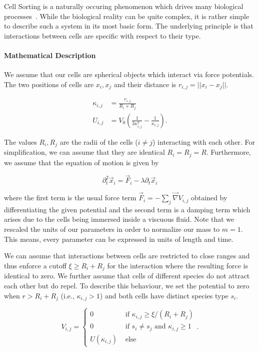 \documentclass[fontsize=11pt,a4paper]{article}
\begin{document}
Cell Sorting is a naturally occuring phenomenon which drives many biological
processes~\cite{Steinberg1963,Graner1992}.
While the biological reality can be quite complex, it is rather simple to describe such
a system in its most basic form.
The underlying principle is that interactions between cells are specific with respect to their type.

\paragraph{Mathematical Description}
We assume that our cells are spherical objects which interact via force potentials.
The two positions of cells are $x_i,x_j$ and their distance is $r_{i,j}=||x_i-x_j||$.

\begin{align}
    \kappa_{i,j} &= \frac{r_{i,j}}{R_i + R_j}\\
    U_{i,j} &= V_0 \left(\frac{1}{3\kappa_{i,j}^3} - \frac{1}{\kappa_{i,j}}\right).
\end{align}

The values $R_i,R_j$ are the radii of the cells ($i\neq j$) interacting with each other.
For simplification, we can assume that they are identical $R_i=R_j=R$.
Furthermore, we assume that the equation of motion is given by

\begin{equation}
    \partial^2_t \vec{x}_i = \vec{F}_i - \lambda \partial_t \vec{x}_i
\end{equation}

where the first term is the usual force term $\vec{F}_i = - \sum_j\vec{\nabla} V_{i,j}$ obtained by
differentiating the given potential and the second term is a damping term which arises due to the
cells being immersed inside a viscuous fluid.
Note that we rescaled the units of our parameters in order to normalize our mass to $m=1$.
This means, every parameter can be expressed in units of length and time.

We can assume that interactions between cells are restricted to close ranges and thus enforce a
cutoff $\xi\geq R_i+R_j$ for the interaction where the resulting force is identical to zero.
We further assume that cells of different species do not attract each other but do repel.
To describe this behaviour, we set the potential to zero when $r>R_i+R_j$ (i.e., $\kappa_{i,j}>1$)
and both cells have distinct species type $s_i$.

\begin{equation}
    V_{i,j} =
    \begin{cases}
        0 &\text{ if } \kappa_{i,j}\geq\xi/(R_i+R_j)\\
        0 &\text{ if } s_i\neq s_j \text{ and } \kappa_{i,j}\geq 1\\
        U(\kappa_{i,j}) &\text{ else }
    \end{cases}.
\end{equation}
\end{document}
